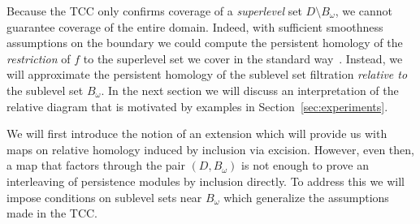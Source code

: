 
Because the TCC only confirms coverage of a \emph{superlevel} set $D\setminus B_\omega$, we cannot guarantee coverage of the entire domain.
Indeed, with sufficient smoothness assumptions on the boundary we could compute the persistent homology of the \emph{restriction} of $f$ to the superlevel set we cover in the standard way~\cite{chazal09analysis}.
Instead, we will approximate the persistent homology of the sublevel set filtration \emph{relative to} the sublevel set $B_\omega$.
In the next section we will discuss an interpretation of the relative diagram that is motivated by examples in Section~\ref{sec:experiments}.

We will first introduce the notion of an extension which will provide us with maps on relative homology induced by inclusion via excision.
However, even then, a map that factors through the pair $(D, B_\omega)$ is not enough to prove an interleaving of persistence modules by inclusion directly.
To address this we will impose conditions on sublevel sets near $B_\omega$ which generalize the assumptions made in the TCC.
